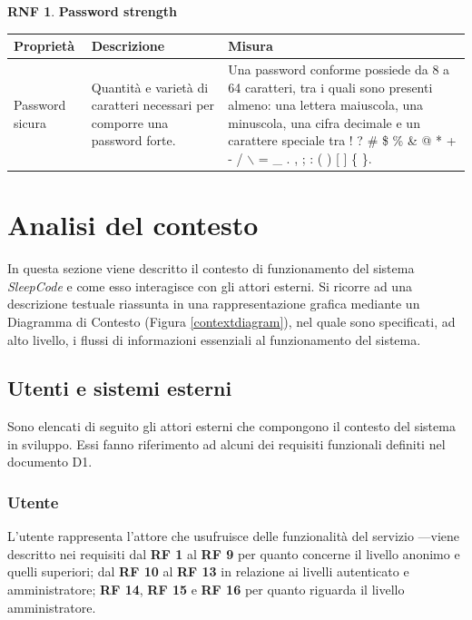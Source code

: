 \documentclass[11pt, a4paper]{article}
\theoremstyle{definition} %
\newtheorem{nonfuncreq}{RNF} %
\begin{document}
\begin{nonfuncreq}
    \textbf{Password strength }
    \begin{center}
        \footnotesize
        \begin{tabularx}{\textwidth}{|X||X||X|}
            \hline
            \cellcolor{red!70}Proprietà & \cellcolor{red!70}Descrizione & \cellcolor{red!70}Misura\\
            \hline
            Password sicura & Quantità e varietà di caratteri necessari per comporre una password forte. & Una password conforme possiede da 8 a 64 caratteri, tra i quali sono presenti almeno: una lettera maiuscola, una minuscola, una cifra decimale e un carattere speciale tra ! ? \# \$ \% \& @ * + - / $\backslash$ = \_ . , ; : ( ) [ ] \{ \}.\\
            \hline
        \end{tabularx}
    \end{center}
\end{nonfuncreq}





\newpage
\section{Analisi del contesto}
In questa sezione viene descritto il contesto di funzionamento del sistema
\textit{SleepCode} e come esso interagisce con gli attori esterni. Si
ricorre ad una descrizione testuale riassunta in una rappresentazione
grafica mediante un Diagramma di Contesto (Figura \ref{contextdiagram}),
nel quale sono specificati, ad alto livello, i flussi di informazioni
essenziali al funzionamento del sistema.

\subsection{Utenti e sistemi esterni} %
Sono elencati di seguito gli attori esterni che compongono il contesto
del sistema in sviluppo. Essi fanno riferimento ad alcuni dei requisiti
funzionali definiti nel documento D1.

\subsubsection{Utente}
L'utente rappresenta l'attore che usufruisce delle funzionalità del servizio
—viene descritto nei requisiti dal \textbf{RF 1} al \textbf{RF 9} per quanto
concerne il livello anonimo e quelli superiori; dal \textbf{RF 10} al
\textbf{RF 13} in relazione ai livelli autenticato e amministratore; \textbf{RF 14},
\textbf{RF 15} e \textbf{RF 16} per quanto riguarda il livello amministratore.
\end{document}
